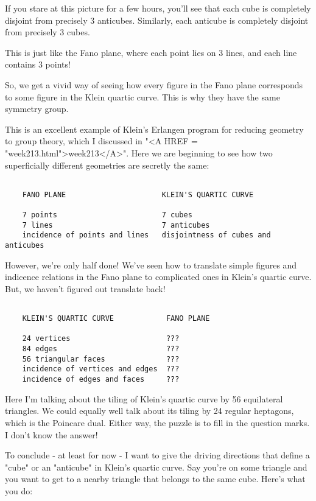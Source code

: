 If you stare at this picture for a few hours, you'll see that each 
cube is completely disjoint from precisely 3 anticubes.  Similarly, 
each anticube is completely disjoint from precisely 3 cubes.  

This is just like the Fano plane, where each point lies on 3 lines, 
and each line contains 3 points!

So, we get a vivid way of seeing how every figure in the Fano 
plane corresponds to some figure in the Klein quartic curve. 
This is why they have the same symmetry group.  

This is an excellent example of Klein's Erlangen program for reducing 
geometry to group theory, which I discussed in "<A HREF = "week213.html">week213</A>".  Here we are 
beginning to see how two superficially different geometries are secretly 
the same:


\begin{verbatim}

    FANO PLANE                      KLEIN'S QUARTIC CURVE
 
    7 points                        7 cubes
    7 lines                         7 anticubes
    incidence of points and lines   disjointness of cubes and anticubes
\end{verbatim}
    
However, we're only half done!  We've seen how to translate simple 
figures and indicence relations in the Fano plane to complicated ones
in Klein's quartic curve.  But, we haven't figured out translate back!
 

\begin{verbatim}

    KLEIN'S QUARTIC CURVE            FANO PLANE
       
    24 vertices                      ??? 
    84 edges                         ???
    56 triangular faces              ???
    incidence of vertices and edges  ???
    incidence of edges and faces     ???
\end{verbatim}
    
Here I'm talking about the tiling of Klein's quartic curve by 56
equilateral triangles.  We could equally well talk about its tiling
by 24 regular heptagons, which is the Poincare dual.  Either way, the
puzzle is to fill in the question marks.  I don't know the answer!

To conclude - at least for now - I want to give the driving directions 
that define a "cube" or an "anticube" in Klein's quartic curve.  Say 
you're on some triangle and you want to get to a nearby triangle that 
belongs to the same cube.  Here's what you do:

